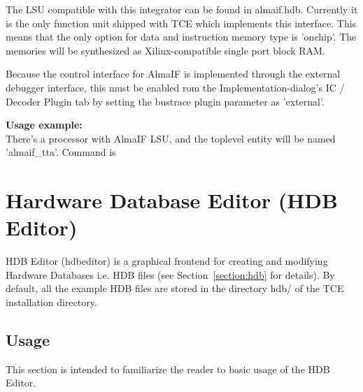 \documentclass[twoside]{tceusermanual}
\begin{document}
The LSU compatible with this integrator can be found in almaif.hdb. Currently
it is the only function unit shipped with TCE which implements this interface.
This means that the only option for data and instruction memory type is 
'onchip'. The memories will be synthesized as Xilinx-compatible single port
block RAM.

Because the control interface for AlmaIF is implemented through the external 
debugger interface, this must be enabled rom the Implementation-dialog's 
IC / Decoder Plugin tab by setting the bustrace plugin parameter as 'external'.

\textbf{Usage example:} \\
There's a processor with AlmaIF LSU, and the toplevel entity will be named
'almaif\_tta'. Command is



\section{Hardware Database Editor (HDB Editor)}
\label{sec:hdbedit}

 

HDB Editor (hdbeditor) is a graphical frontend for creating and
modifying Hardware Databases i.e. HDB files (see Section~\ref{section:hdb}
for details). By default, all the example HDB files are stored in the directory
hdb/ of the TCE installation directory.

\subsection{Usage}

This section is intended to familiarize the reader to basic usage of the HDB
Editor.
\end{document}
